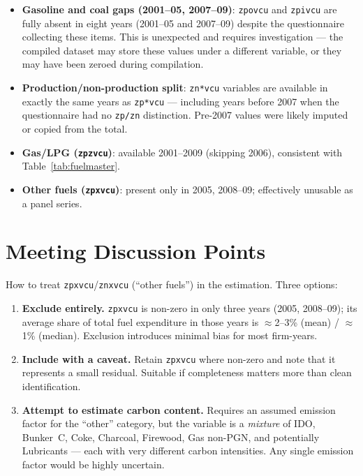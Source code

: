 \documentclass[11pt, a4paper]{article}
\begin{document}
\begin{itemize}[noitemsep]
  \item \textbf{Gasoline and coal gaps (2001--05, 2007--09)}: \texttt{zpovcu} and
        \texttt{zpivcu} are fully absent in eight years (2001--05 and 2007--09) despite the questionnaire
        collecting these items. This is unexpected and requires investigation ---
        the compiled dataset may store these values under a different variable,
        or they may have been zeroed during compilation.
  \item \textbf{Production/non-production split}: \texttt{zn*vcu} variables are
        available in exactly the same years as \texttt{zp*vcu} --- including years
        before 2007 when the questionnaire had no \texttt{zp/zn} distinction.
        Pre-2007 values were likely imputed or copied from the total.
  \item \textbf{Gas/LPG (\texttt{zpzvcu})}: available 2001--2009 (skipping 2006),
        consistent with Table~\ref{tab:fuelmaster}.
  \item \textbf{Other fuels (\texttt{zpxvcu})}: present only in 2005, 2008--09;
        effectively unusable as a panel series.
\end{itemize}


\clearpage
\section*{Meeting Discussion Points}

\vspace{0.5em}

\begin{tcolorbox}[
  colframe=warnred, colback=red!4!white,
  boxrule=1.2pt, arc=3pt,
  left=8pt, right=8pt, top=6pt, bottom=6pt,
  title={\color{warnred}\textbf{Need to Decide}},
  fonttitle=\bfseries, colbacktitle=red!10!white, coltitle=warnred,
  titlerule=0.5pt]
How to treat \texttt{zpxvcu}/\texttt{znxvcu} (``other fuels'') in the estimation.
Three options:
\begin{enumerate}[noitemsep, topsep=4pt]
  \item \textbf{Exclude entirely.} \texttt{zpxvcu} is non-zero in only three years
        (2005, 2008--09); its average share of total fuel expenditure in those years
        is $\approx$2--3\% (mean) / $\approx$1\% (median). Exclusion introduces
        minimal bias for most firm-years.
  \item \textbf{Include with a caveat.} Retain \texttt{zpxvcu} where non-zero and
        note that it represents a small residual. Suitable if completeness matters
        more than clean identification.
  \item \textbf{Attempt to estimate carbon content.} Requires an assumed emission
        factor for the ``other'' category, but the variable is a \textit{mixture}
        of IDO, Bunker~C, Coke, Charcoal, Firewood, Gas non-PGN, and potentially
        Lubricants --- each with very different carbon intensities.
        Any single emission factor would be highly uncertain.
\end{enumerate}
\end{tcolorbox}
\end{document}

